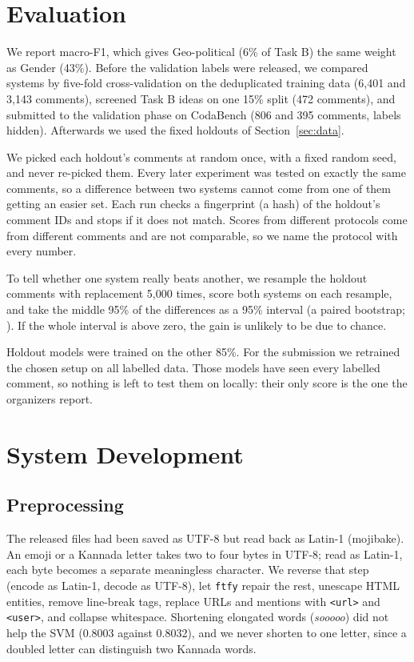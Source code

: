 \documentclass[11pt]{article}
\newcommand{\taskb}{Task B}
\begin{document}
\section{Evaluation}
\label{sec:eval}
We report macro-F1, which gives Geo-political (6\% of \taskb{}) the same weight
as Gender (43\%). Before the validation labels were released, we compared systems
by five-fold cross-validation on the deduplicated training data (6,401 and 3,143
comments), screened \taskb{} ideas on one 15\% split (472 comments), and
submitted to the validation phase on CodaBench (806 and 395 comments, labels
hidden). Afterwards we used the fixed holdouts of Section~\ref{sec:data}.

We picked each holdout's comments at random once, with a fixed random seed, and
never re-picked them. Every later experiment was tested on exactly the same
comments, so a difference between two systems cannot come from one of them
getting an easier set. Each run checks a fingerprint (a hash) of the holdout's
comment IDs and stops if it does not match. Scores from different protocols come
from different comments and are not comparable, so we name the protocol with
every number.

To tell whether one system really beats another, we resample the holdout
comments with replacement 5,000 times, score both systems on each resample, and
take the middle 95\% of the differences as a 95\% interval (a paired bootstrap;
\citealp{efron-1979-bootstrap, koehn-2004-statistical,
berg-kirkpatrick-etal-2012-empirical, dror-etal-2018-hitchhikers}).
If the whole interval is above zero, the gain is unlikely to be due to chance.

Holdout models were trained on the other 85\%. For the submission we retrained
the chosen setup on all labelled data. Those models have seen every labelled
comment, so nothing is left to test them on locally: their only score is the
one the organizers report.

\section{System Development}
\label{sec:dev}

\subsection{Preprocessing}
\label{sec:prep}
The released files had been saved as UTF-8 but read back as Latin-1 (mojibake).
An emoji or a Kannada letter takes two to four bytes in UTF-8; read as Latin-1,
each byte becomes a separate meaningless character. We reverse that step
(encode as Latin-1, decode as UTF-8), let \texttt{ftfy} \citep{speer-2019-ftfy}
repair the rest, unescape
HTML entities, remove line-break tags, replace URLs and mentions with
\texttt{<url>} and \texttt{<user>}, and collapse whitespace. Shortening elongated
words (\textit{sooooo}) did not help the SVM (0.8003 against 0.8032), and we never
shorten to one letter, since a doubled letter can distinguish two Kannada words.
\end{document}
